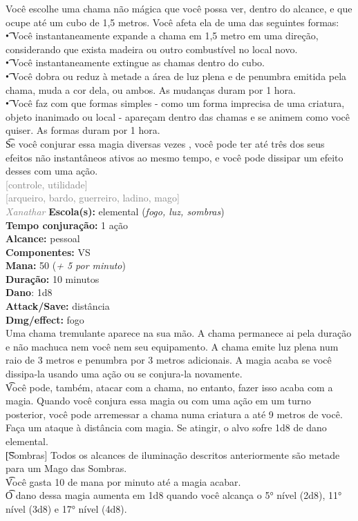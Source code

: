 \documentclass{RPG_Adventure}[2021/10/20]
\begin{document}
{\normalsize Você escolhe uma chama não mágica que você possa ver, dentro do alcance, e que ocupe até um cubo de 1,5 metros. Você afeta ela de uma das seguintes formas:\\\t • Você instantaneamente expande a chama em 1,5 metro em uma direção, considerando que exista madeira ou outro combustível no local novo.\\\t • Você instantaneamente extingue as chamas dentro do cubo.\\\t • Você dobra ou reduz à metade a área de luz plena e de penumbra emitida pela chama, muda a cor dela, ou ambos. As mudanças duram por 1 hora.\\\t • Você faz com que formas simples - como um forma imprecisa de uma criatura, objeto inanimado ou local - apareçam dentro das chamas e se animem como você quiser. As formas duram por 1 hora.\\\t Se você conjurar essa magia diversas vezes , você pode ter até três dos seus efeitos não instantâneos ativos ao mesmo tempo, e você pode dissipar um efeito desses com uma ação.\\}
{\scriptsize \textcolor{gray}{[controle, utilidade]\\}}
{\scriptsize \textcolor{gray}{[arqueiro, bardo, guerreiro, ladino, mago]\\}}
{\tiny \textcolor{gray}{\textit{Xanathar}}}
{\small \t \textbf{Escola(s):} elemental (\textit{fogo, luz, sombras})\\\t \textbf{Tempo conjuração:} 1 ação\\\t \textbf{Alcance:} pessoal\\\t \textbf{Componentes:} VS\\\t \textbf{Mana:} 50 (\textit{+ 5 por minuto})\\\t \textbf{Duração:} 10 minutos\\\t \textbf{Dano}: 1d8\\\t \textbf{Attack/Save:} distância\\\t \textbf{Dmg/effect:} fogo\\}
{\normalsize Uma chama tremulante aparece na sua mão. A chama permanece ai pela duração e não machuca nem você nem seu equipamento. A chama emite luz plena num raio de 3 metros e penumbra por 3 metros adicionais. A magia acaba se você dissipa-la usando uma ação ou se conjura-la novamente.\\\t Você pode, também, atacar com a chama, no entanto, fazer isso acaba com a magia. Quando você conjura essa magia ou com uma ação em um turno posterior, você pode arremessar a chama numa criatura a até 9 metros de você. Faça um ataque à distância com magia. Se atingir, o alvo sofre 1d8 de dano elemental.\\\t [Sombras] Todos os alcances de iluminação descritos anteriormente são metade para um Mago das Sombras.\\\t Você gasta 10 de mana por minuto até a magia acabar.\\\t O dano dessa magia aumenta em 1d8 quando você alcança o 5° nível (2d8), 11° nível (3d8) e 17° nível (4d8).\\}
\end{document}
